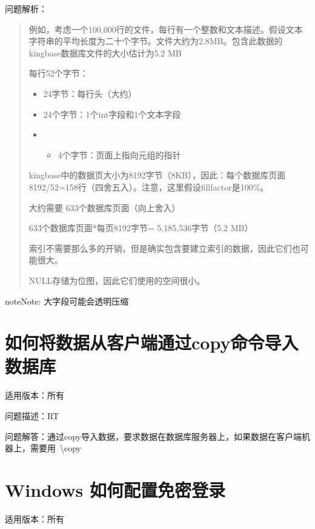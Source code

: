 \documentclass[a4,10pt,oneside,english]{sphinxmanual}
\begin{document}
问题解析：
\begin{quote}

例如，考虑一个100,000行的文件，每行有一个整数和文本描述。假设文本字符串的平均长度为二十个字节。文件大约为2.8MB。包含此数据的kingbase数据库文件的大小估计为5.2 MB

每行52个字节：
\begin{itemize}
\item {} 
24字节：每行头（大约）

\item {} 
24个字节：1个int字段和1个文本字段

\item {} \begin{itemize}
\item {} 
4个字节：页面上指向元组的指针

\end{itemize}

\end{itemize}

kingbase中的数据页大小为8192字节（8KB），因此：每个数据库页面8192/52=158行（四舍五入）。注意，这里假设fillfactor是100\%。

大约需要 633个数据库页面（向上舍入）

633个数据库页面*每页8192字节= 5,185,536字节（5.2 MB）

索引不需要那么多的开销，但是确实包含要建立索引的数据，因此它们也可能很大。

NULL存储为位图，因此它们使用的空间很小。
\end{quote}

\begin{sphinxadmonition}{note}{Note:}
大字段可能会透明压缩
\end{sphinxadmonition}


\section{如何将数据从客户端通过copy命令导入数据库}
\label{\detokenize{sql:copy}}
适用版本：所有

问题描述：RT

问题解答：通过copy导入数据，要求数据在数据库服务器上，如果数据在客户端机器上，需要用 \textbackslash{}copy


\section{Windows 如何配置免密登录}
\label{\detokenize{sql:id16}}
适用版本：所有
\end{document}
